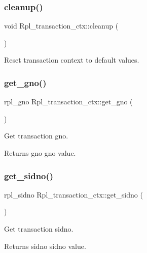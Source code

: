 \subsubsection{\texorpdfstring{cleanup()}{cleanup()}}
{\footnotesize\ttfamily void Rpl\+\_\+transaction\+\_\+ctx\+::cleanup (\begin{DoxyParamCaption}{ }\end{DoxyParamCaption})}

Reset transaction context to default values. \mbox{\label{classRpl__transaction__ctx_a7838f13fc5d27de9e6b5ffb9af1b171a}} 
\subsubsection{\texorpdfstring{get\+\_\+gno()}{get\_gno()}}
{\footnotesize\ttfamily rpl\+\_\+gno Rpl\+\_\+transaction\+\_\+ctx\+::get\+\_\+gno (\begin{DoxyParamCaption}{ }\end{DoxyParamCaption})}

Get transaction gno.

\begin{DoxyReturn}{Returns}
gno gno value. 
\end{DoxyReturn}
\mbox{\label{classRpl__transaction__ctx_aeb35b76ddcd546ceb7ca9b9d8749f499}} 
\subsubsection{\texorpdfstring{get\+\_\+sidno()}{get\_sidno()}}
{\footnotesize\ttfamily rpl\+\_\+sidno Rpl\+\_\+transaction\+\_\+ctx\+::get\+\_\+sidno (\begin{DoxyParamCaption}{ }\end{DoxyParamCaption})}

Get transaction sidno.

\begin{DoxyReturn}{Returns}
sidno sidno value. 
\end{DoxyReturn}
\mbox{\label{classRpl__transaction__ctx_a5a71e376fec6821b0b77d92e52810143}} 
